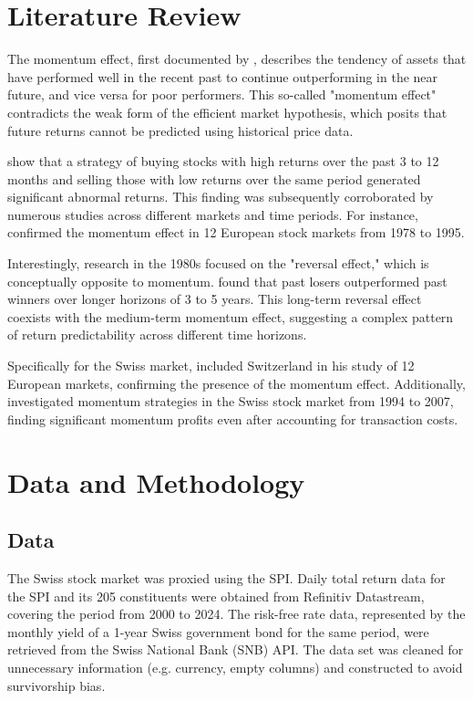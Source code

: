 \documentclass[a4paper,12pt]{article}
\begin{document}
\newpage

\section{Literature Review}
The momentum effect, first documented by \cite{jegatit1993}, describes the tendency of assets that have performed well in the recent past to continue outperforming in the near future, and vice versa for poor performers. This so-called "momentum effect" contradicts the weak form of the efficient market hypothesis, which posits that future returns cannot be predicted using historical price data. 

\cite{jegatit1993} show that a strategy of buying stocks with high returns over the past 3 to 12 months and selling those with low returns over the same period generated significant abnormal returns. This finding was subsequently corroborated by numerous studies across different markets and time periods. For instance, \cite{rouwenhorst1998} confirmed the momentum effect in 12 European stock markets from 1978 to 1995. 

Interestingly, research in the 1980s focused on the "reversal effect," which is conceptually opposite to momentum. \cite{debondt1987} found that past losers outperformed past winners over longer horizons of 3 to 5 years. This long-term reversal effect coexists with the medium-term momentum effect, suggesting a complex pattern of return predictability across different time horizons. 

Specifically for the Swiss market, \cite{rouwenhorst1998} included Switzerland in his study of 12 European markets, confirming the presence of the momentum effect. Additionally, \cite{ammann2008} investigated momentum strategies in the Swiss stock market from 1994 to 2007, finding significant momentum profits even after accounting for transaction costs.

\newpage
\section{Data and Methodology}
\subsection{Data}
The Swiss stock market was proxied using the SPI. Daily total return data for the SPI and its 205 constituents were obtained from Refinitiv Datastream, covering the period from 2000 to 2024. The risk-free rate data, represented by the monthly yield of a 1-year Swiss government bond for the same period, were retrieved from the Swiss National Bank (SNB) API. The data set was cleaned for unnecessary information (e.g. currency, empty columns) and constructed to avoid survivorship bias.
\end{document}
